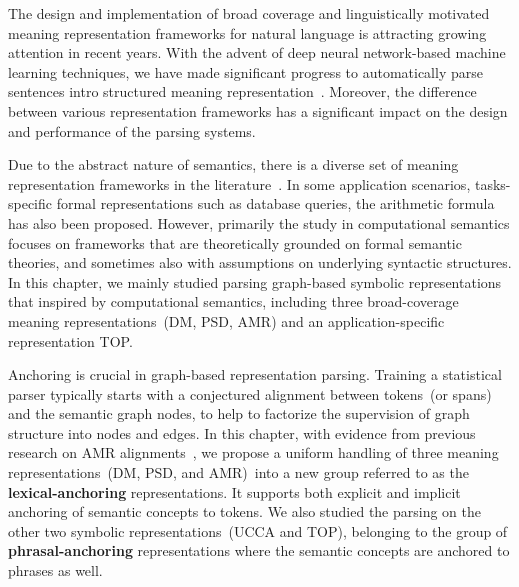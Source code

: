 The design and implementation of broad coverage and linguistically
motivated meaning representation frameworks for natural language is
attracting growing attention in recent years. With the advent of deep
neural network-based machine learning techniques, we have made
significant progress to automatically parse sentences intro structured
meaning
representation~\citep{Oep:Kuh:Miy:14,Oep:Kuh:Miy:15,May:2016wc,hershcovich-etal-2019-semeval}. Moreover,
the difference between various representation frameworks has a
significant impact on the design and performance of the parsing
systems.

Due to the abstract nature of semantics, there is a diverse set of
meaning representation frameworks in the
literature~\citep{abend2017state}. In some application scenarios,
tasks-specific formal representations such as database queries,
the arithmetic formula has also been proposed. However, primarily the study
in computational semantics focuses on frameworks that are
theoretically grounded on formal semantic theories, and sometimes also
with assumptions on underlying syntactic structures. In this chapter,
we mainly studied parsing graph-based symbolic representations that
inspired by computational semantics, including three broad-coverage
meaning representations~(DM, PSD, AMR) and an application-specific
representation TOP.

Anchoring is crucial in graph-based representation parsing. Training a
statistical parser typically starts with a conjectured alignment
between tokens~(or spans) and the semantic graph nodes, to help to
factorize the supervision of graph structure into nodes and edges. In
this chapter, with evidence from previous research on AMR
alignments~\citep{Pourdamghani:2014aligning,Flanigan:2014vc,Wang:2017vt,chen2017unsupervised,szubert2018structured,lyu2018amr},
we propose a uniform handling of three meaning representations~(DM,
PSD, and AMR)~into a new group referred to as the
\textbf{lexical-anchoring} representations. It supports both explicit
and implicit anchoring of semantic concepts to tokens. We also studied
the parsing on the other two symbolic representations~(UCCA and TOP),
belonging to the group of \textbf{phrasal-anchoring} representations
where the semantic concepts are anchored to phrases as well.


